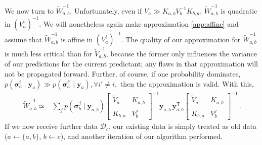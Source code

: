 \documentclass{article} %
\newcommand{\given}{\!\ensuremath{\mid}\!}
\newcommand{\cm}[1]{\ensuremath{\mathcal{#1}}}
\newcommand{\bm}[1]{\ensuremath{\mathbf{#1}}}
\newcommand{\data}{\ensuremath{\cm{D}}}
\newcommand{\vect}[1]{\bm{#1}}
\newcommand{\vy}{\vect{y}}
\newcommand{\vs}{\vect{\sigma}}
\newcommand{\fPr}{p}
\newcommand{\Prob}[2]{\fPr(#1 \given #2 )}
\newcommand{\tr}{\ensuremath{\mathsf{T}}}
\begin{document}
We now turn to $\tilde{W}_{a,b}^{-1}$. Unfortunately, even if
$V_a \gg K_{a,b} V_b^{-1} K_{b,a}$, $\tilde{W}_{a,b}^{-1}$ is quadratic in
$(V^i_a)^{-1}$. We will nonetheless again make approximation \ref{app:affine} and assume that $\tilde{W}_{a,b}^{-1}$
is affine in $(V^i_a)^{-1}$. The quality of our approximation for
$\tilde{W}_{a,b}^{-1}$ is much less critical than for
$\tilde{V}^{-1}_{a,b}$, because the former only influences the
variance of our predictions for the current predictant; any flaws in
that approximation will not be propagated forward. Further, of course,
if one probability dominates, 
$
\Prob{\vs^i_{a}}{\vy_{a}}\gg
\Prob{\vs^{i'}_{a}}{\vy_{a}}, \forall i' \neq i,
$
then the approximation is valid. With this,
\begin{align*}
\tilde{W}^{-1}_{a,b} \simeq
& \sum_{j} \Prob{\vs^j_{b}}{\vy_{a,b}} \begin{bmatrix}
 \tilde{V}_a & K_{a,b}
\\
 K_{b,a} & V^j_b
\end{bmatrix}^{-1}\vy_{a,b}^{\phantom{\tr}}\, \vy_{a,b}^\tr \begin{bmatrix}
 \tilde{V}_a & K_{a,b}
\\
 K_{b,a} & V^j_b
\end{bmatrix}^{-1}\,.%
\end{align*}
If we now receive further data $\data_c$, our existing data is simply treated as old data ($a \leftarrow \{a,b\}$, $b \leftarrow c$), and another iteration of our algorithm performed.
\end{document}

